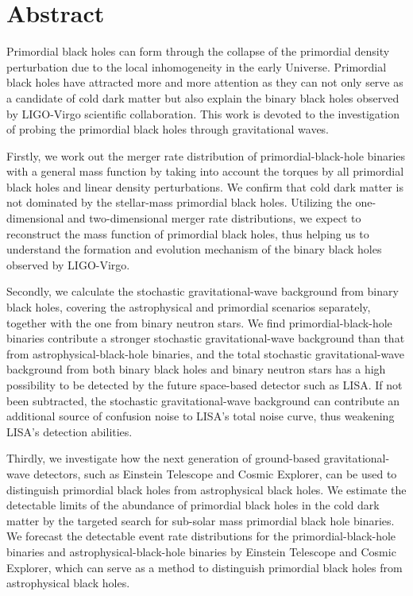\intobmk\chapter*{Abstract}%

Primordial black holes can form through the collapse of the primordial density perturbation due to the local inhomogeneity in the early Universe. Primordial black holes have attracted more and more attention as they can not only serve as a candidate of cold dark matter but also explain the binary black holes observed by LIGO-Virgo scientific collaboration. This work is devoted to the investigation of probing the primordial black holes through gravitational waves.

Firstly, we work out the merger rate distribution of primordial-black-hole binaries with a general mass function by taking into account the torques by all primordial black holes and linear density perturbations. We confirm that cold dark matter is not dominated by the stellar-mass primordial black holes. Utilizing the one-dimensional and two-dimensional merger rate distributions, we expect to reconstruct the mass function of primordial black holes, thus helping us to understand the formation and evolution mechanism of the binary black holes observed by LIGO-Virgo. 

Secondly, we calculate the stochastic gravitational-wave background from binary black holes, covering the astrophysical and primordial scenarios separately, together with the one from binary neutron stars. We find primordial-black-hole binaries contribute a stronger stochastic gravitational-wave background than that from astrophysical-black-hole binaries, and the total stochastic gravitational-wave background from both binary black holes and binary neutron stars has a high possibility to be detected by the future space-based detector such as LISA. If not been subtracted, the stochastic gravitational-wave background can contribute an additional source of confusion noise to LISA's total noise curve, thus weakening LISA's detection abilities. 

Thirdly, we investigate how the next generation of ground-based gravitational-wave detectors, such as Einstein Telescope and Cosmic Explorer, can be used to distinguish primordial black holes from astrophysical black holes. We estimate the detectable limits of the abundance of primordial black holes in the cold dark matter by the targeted search for sub-solar mass primordial black hole binaries. We forecast the detectable event rate distributions for the primordial-black-hole binaries and astrophysical-black-hole binaries by Einstein Telescope and Cosmic Explorer, which can serve as a method to distinguish primordial black holes from astrophysical black holes.

